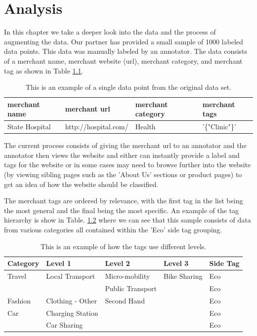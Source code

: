 \chapter{Analysis}

In this chapter we take a deeper look into the data and the process of augmenting the data. Our partner has provided a small sample of 1000 labeled data points. This data was manually labeled by an annotator. The data consists of a merchant name, merchant website (url), merchant category, and merchant tag as shown in Table \ref{tab:data_point}. 


\begin{table}[h]
\begin{tabular}{|l|l|l|l|}
\hline
merchant name            & merchant url            & merchant category & merchant tags           \\ \hline
State Hospital & http://hospital.com/ & Health   & '\{"Clinic"\}' \\ \hline
\end{tabular}
\caption{This is an example of a single data point from the original data set.}
\label{tab:data_point}
\end{table}


The current process consists of giving the merchant url to an annotator and the annotator then views the website and either can instantly  provide a label and tags for the website or in some cases may need to browse further into the website (by viewing sibling pages such as the 'About Us' sections or product pages) to get an idea of how the website should be classified. 

The merchant tags are ordered by relevance, with the first tag in the list being the most general and the final being the most specific. An example of the tag hierarchy is show in Table. \ref{tab:tags} where we can see that this sample consists of data from various categories all contained within the 'Eco' side tag grouping.


\begin{table}[h]
\begin{tabular}{|l|l|l|l|l|}
\hline
Category       & Level 1                     & Level 2                       & Level 3      & Side Tag \\ \hline
Travel         & Local Transport             & Micro-mobility                & Bike Sharing & Eco      \\ \hline
               &                             & Public Transport              &              & Eco      \\ \hline
Fashion        & Clothing - Other            & Second Hand                   &              & Eco      \\ \hline
Car            & Charging Station            &                               &              & Eco      \\ \hline
               & Car Sharing                 &                               &              & Eco      \\ \hline
\end{tabular}
\caption{This is an example of how the tags use different levels.}
\label{tab:tags}
\end{table}


